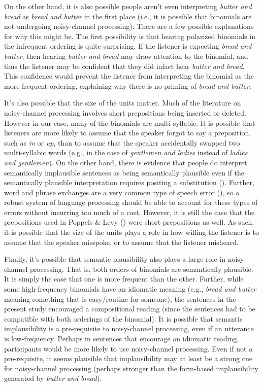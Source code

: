 \documentclass[
  12pt,
]{scrartcl}
\begin{document}
On the other hand, it is also possible people aren't even interpreting
\emph{butter and bread} as \emph{bread and butter} in the first place
(i.e., it is possible that binomials are not undergoing noisy-channel
processing). There are a few possible explanations for why this might
be. The first possibility is that hearing polarized binomials in the
infrequent ordering is quite surprising. If the listener is expecting
\emph{bread and butter}, then hearing \emph{butter and bread} may draw
attention to the binomial, and thus the listener may be confident that
they did infact hear \emph{butter and bread}. This confidence would
prevent the listener from interpreting the binomial as the more frequent
ordering, explaining why there is no priming of \emph{bread and butter}.

It's also possible that the size of the units matter. Much of the
literature on noisy-channel processing involves short prepositions being
inserted or deleted. However in our case, many of the binomials are
multi-syllabic. It is possible that listeners are more likely to assume
that the speaker forgot to say a preposition, such as \emph{in} or
\emph{up}, than to assume that the speaker accidentally swapped two
multi-syllabic words (e.g., in the case of \emph{gentlemen and ladies}
instead of \emph{ladies and gentlemen}). On the other hand, there is
evidence that people do interpret semantically implausible sentences as
being semantically plausible even if the semantically plausible
interpretation requires positing a substitution
(). Further, word and phrase exchanges are a very common type
of speech error (), so a robust system of language processing should be able to
account for these types of errors without incurring too much of a cost.
However, it is still the case that the prepositions used in Poppels \&
Levy ()
were short prepositions as well. As such, it is possible that the size
of the units plays a role in how willing the listener is to assume that
the speaker misspoke, or to assume that the listener misheard.

Finally, it's possible that semantic plausibility also plays a large
role in noisy-channel processing. That is, both orders of binomials are
semantically plausible. It is simply the case that one is more frequent
than the other. Further, while some high-frequency binomials have an
idiomatic meaning (e.g., \emph{bread and butter} meaning something that
is easy/routine for someone), the sentences in the present study
encouraged a compositional reading (since the sentences had to be
compatible with both orderings of the binomial). It is possible that
semantic implausibility is a pre-requisite to noisy-channel processing,
even if an utterance is low-frequency. Perhaps in sentences that
encourage an idiomatic reading, participants would be more likely to use
noisy-channel processing. Even if not a pre-requisite, it seems
plausible that implausibility may at least be a strong cue for
noisy-channel processing (perhaps stronger than the form-based
implausibility generated by \emph{butter and bread}).
\end{document}
